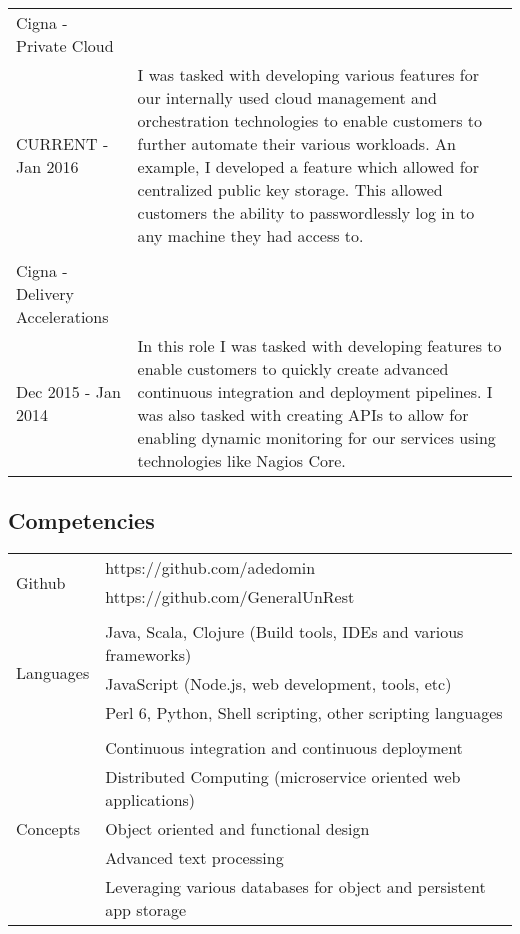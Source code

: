 \documentclass[10pt,letterpaper,]{article}
\begin{document}
\begin{center}
\begin{tabularx}{\textwidth}{l|X}
    Cigna - Private Cloud \\
    CURRENT - Jan 2016 & I was tasked with developing various features for our internally used cloud management and orchestration technologies to enable customers to further automate their various workloads. An example, I developed a feature which allowed for centralized public key storage. This allowed customers the ability to passwordlessly log in to any machine they had access to. \\
    & \\
    Cigna - Delivery Accelerations \\
    Dec 2015 - Jan 2014 & In this role I was tasked with developing features to enable customers to quickly create advanced continuous integration and deployment pipelines. I was also tasked with creating APIs to allow for enabling dynamic monitoring for our services using technologies like Nagios Core. \\
\end{tabularx}
\end{center}

\subsection{Competencies}\label{competencies}

\begin{center}
\begin{tabular}{l|l}
    \multirow{2}{*}{Github} & https://github.com/adedomin \\
                            & https://github.com/GeneralUnRest \\
    \\
    \multirow{3}{*}{Languages} & Java, Scala, Clojure (Build tools, IDEs and various frameworks) \\
                               & JavaScript (Node.js, web development, tools, etc) \\
                               & Perl 6, Python, Shell scripting, other scripting languages \\
    \\
    \multirow{5}{*}{Concepts} & Continuous integration and continuous deployment \\
                              & Distributed Computing (microservice oriented web applications) \\
                              & Object oriented and functional design \\
                              & Advanced text processing \\
                              & Leveraging various databases for object and persistent app storage \\
\end{tabular}
\end{center}
\end{document}
